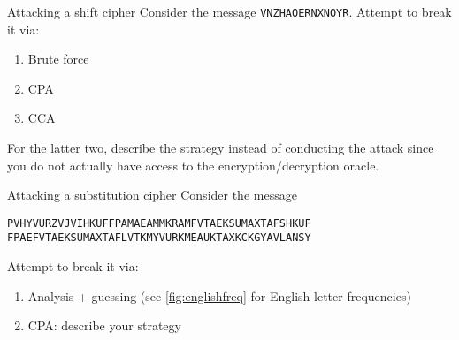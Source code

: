 \documentclass{practice}
\begin{document}
\begin{task}{Attacking a shift cipher}
  Consider the message \texttt{VNZHAOERNXNOYR}.
  Attempt to break it via:
  \begin{enumerate}
    \item Brute force
    \item CPA
    \item CCA
  \end{enumerate}
  For the latter two, describe the strategy instead of conducting the attack since you do not actually have access to the encryption/decryption oracle.
\end{task}

\newpage

\begin{task}{Attacking a substitution cipher}
  Consider the message
\begin{Verbatim}
PVHYVURZVJVIHKUFFPAMAEAMMKRAMFVTAEKSUMAXTAFSHKUF
FPAEFVTAEKSUMAXTAFLVTKMYVURKMEAUKTAXKCKGYAVLANSY
\end{Verbatim}
Attempt to break it via:
  \begin{enumerate}
    \item Analysis + guessing (see \autoref{fig:englishfreq} for English letter frequencies)
    \item CPA: describe your strategy
  \end{enumerate}

\end{task}
\end{document}
